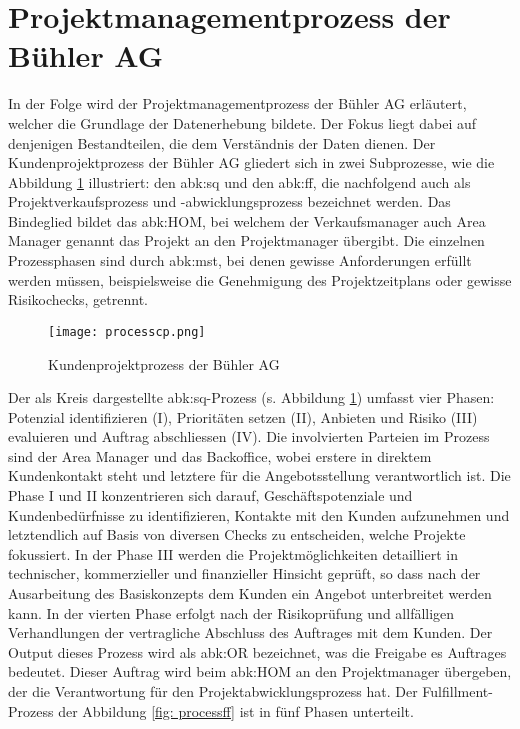 \section{Projektmanagementprozess der Bühler AG}\label{sec:pmbueh}
In der Folge wird der Projektmanagementprozess der Bühler AG erläutert, welcher die Grundlage der Datenerhebung bildete. Der Fokus liegt dabei auf denjenigen Bestandteilen, die dem Verständnis der Daten dienen. Der Kundenprojektprozess der Bühler AG gliedert sich in zwei Subprozesse, wie die Abbildung \ref{fig:processcp} illustriert: den \gls{abk:sq} und den \gls{abk:ff}, die nachfolgend auch als Projektverkaufsprozess und -abwicklungsprozess bezeichnet werden. Das Bindeglied bildet das \gls{abk:HOM}, bei welchem der Verkaufsmanager auch Area Manager genannt das Projekt an den Projektmanager übergibt. Die einzelnen Prozessphasen sind durch \gls{abk:mst}, bei denen gewisse Anforderungen erfüllt werden müssen, beispielsweise die Genehmigung des Projektzeitplans oder gewisse Risikochecks, getrennt.
\begin{figure}[H]
	\centering
	\texttt{[image: processcp.png]}
	\caption{Kundenprojektprozess der Bühler AG}
	\label{fig:processcp}
\end{figure}
Der als Kreis dargestellte \gls{abk:sq}-Prozess (s. Abbildung \ref{fig:processcp}) umfasst vier Phasen: Potenzial identifizieren (I), Prioritäten setzen (II), Anbieten und Risiko (III) evaluieren und Auftrag abschliessen (IV). Die involvierten Parteien im Prozess sind der Area Manager und das Backoffice, wobei erstere in direktem Kundenkontakt steht und letztere für die Angebotsstellung verantwortlich ist. Die Phase I und II konzentrieren sich darauf, Geschäftspotenziale und Kundenbedürfnisse zu identifizieren, Kontakte mit den Kunden aufzunehmen und letztendlich auf Basis von diversen Checks zu entscheiden, welche Projekte fokussiert. In der Phase III werden die Projektmöglichkeiten detailliert in technischer, kommerzieller und finanzieller Hinsicht geprüft, so dass nach der Ausarbeitung des Basiskonzepts dem Kunden ein Angebot unterbreitet werden kann. In der vierten Phase erfolgt nach der Risikoprüfung und allfälligen Verhandlungen der vertragliche Abschluss des Auftrages mit dem Kunden. Der Output dieses Prozess wird als \gls{abk:OR} bezeichnet, was die Freigabe es Auftrages bedeutet. Dieser Auftrag wird beim \gls{abk:HOM} an den Projektmanager übergeben, der die Verantwortung für den Projektabwicklungsprozess hat. Der Fulfillment-Prozess der Abbildung \ref{fig: processff} ist in fünf Phasen unterteilt. 
